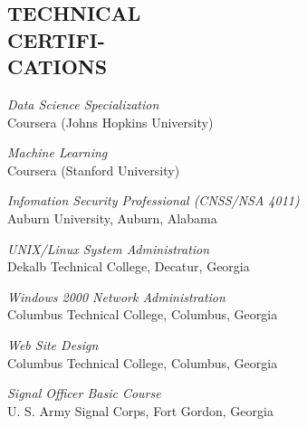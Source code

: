 \documentclass[margin, 11pt]{res} %
\begin{document}
\begin{resume}
 


\section{TECHNICAL\\CERTIFI-\\CATIONS}

{\it Data Science Specialization} \\
Coursera (Johns Hopkins University)

{\it Machine Learning} \\
Coursera (Stanford University)

{\it Infomation Security Professional (CNSS/NSA 4011)} \\
Auburn University, Auburn, Alabama

{\it UNIX/Linux System Administration} \\
Dekalb Technical College, Decatur, Georgia

{\it Windows 2000 Network Administration} \\
Columbus Technical College, Columbus, Georgia

{\it Web Site Design} \\
Columbus Technical College, Columbus, Georgia

{\it Signal Officer Basic Course} \\
U. S. Army Signal Corps, Fort Gordon, Georgia


\end{resume}
\end{document}
